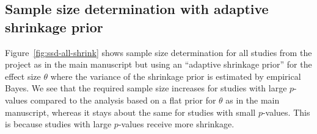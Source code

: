 \begin{subappendices}
\subsection{Sample size determination with adaptive shrinkage prior}
\label{sec:ssdprotzko}
Figure~\ref{fig:ssd-all-shrink} shows sample size determination for all studies
from the \citet{Protzko2020} project as in the main manuscript but using an
``adaptive shrinkage prior'' for the effect size $\theta$ where the variance of
the shrinkage prior is estimated by empirical Bayes. We see that the required
sample size increases for studies with large $p$-values compared to the analysis
based on a flat prior for $\theta$ as in the main manuscript, whereas it stays
about the same for studies with small $p$-values. This is because studies with
large $p$-values receive more shrinkage.
\end{subappendices}



